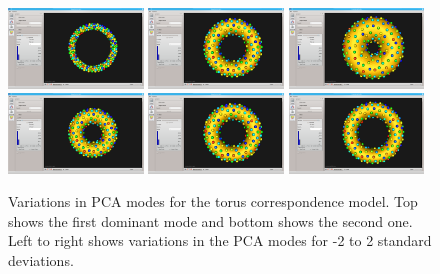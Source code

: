 \documentclass[letterpaper,12pt]{article}   %
\begin{document}
\begin{figure}[!htp]
	\centering
	\includegraphics[width=0.32\textwidth]{figs_v2/torus_analyze_mode1_neg2std.png}
		\includegraphics[width=0.32\textwidth]{figs_v2/torus_analyze_mean.png}
			\includegraphics[width=0.32\textwidth]{figs_v2/torus_analyze_mode1_pos2std.png} \\
	\includegraphics[width=0.32\textwidth]{figs_v2/torus_analyze_mode2_neg2std.png}
	\includegraphics[width=0.32\textwidth]{figs_v2/torus_analyze_mean.png}
	\includegraphics[width=0.32\textwidth]{figs_v2/torus_analyze_mode2_pos2std.png} 
	\caption{ Variations in PCA modes for the torus correspondence model. Top shows the first dominant mode and bottom shows the second one. Left to right shows variations in the PCA modes for -2 to 2 standard deviations. }
	\label{fig:torus_analyze_modes}
\end{figure}
\end{document}
